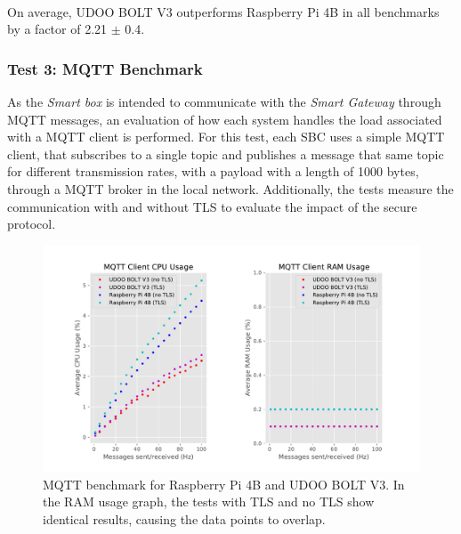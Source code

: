 \paragraph{} On average, UDOO BOLT V3 outperforms Raspberry Pi 4B in all benchmarks by a factor of 2.21 $\pm$ 0.4.

\subsubsection{Test 3: \acs{MQTT} Benchmark}

As the \textit{Smart box} is intended to communicate with the \textit{Smart Gateway} through \acs{MQTT} messages, an evaluation of how each system handles the load associated with a \acs{MQTT} client is performed. For this test, each \acs{SBC} uses a simple \acs{MQTT} client, that subscribes to a single topic and publishes a message that same topic for different transmission rates, with a payload with a length of 1000 bytes, through a \acs{MQTT} broker in the local network. Additionally, the tests measure the communication with and without \acs{TLS} to evaluate the impact of the secure protocol.

\begin{figure}[H]
    \centering
    \includegraphics[width=\linewidth]{images/mqtt_test_results.pdf}
    \caption[\acs{MQTT} benchmark for Raspberry Pi 4B and UDOO BOLT V3.]{\acs{MQTT} benchmark for Raspberry Pi 4B and UDOO BOLT V3. In the \acs{RAM} usage graph, the tests with TLS and no TLS show identical results, causing the data points to overlap.}
    \label{fig:mqtt-tests}
\end{figure}

